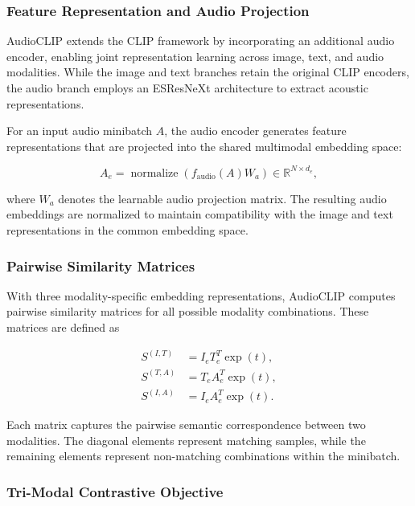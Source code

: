 \documentclass[pdflatex,sn-mathphys-num]{sn-jnl}%
\theoremstyle{thmstyleone}%
\theoremstyle{thmstyletwo}%
\theoremstyle{thmstylethree}%
\begin{document}
\subsubsection{Feature Representation and Audio Projection}

AudioCLIP extends the CLIP framework by incorporating an additional audio encoder, enabling joint representation learning across image, text, and audio modalities. While the image and text branches retain the original CLIP encoders, the audio branch employs an ESResNeXt architecture to extract acoustic representations.

For an input audio minibatch $A$, the audio encoder generates feature representations that are projected into the shared multimodal embedding space:

\begin{equation}
A_e =
\operatorname{normalize}
\left(f_{\mathrm{audio}}(A)W_a\right)
\in \mathbb{R}^{N \times d_e},
\label{eq:audioclip_audio}
\end{equation}

where $W_a$ denotes the learnable audio projection matrix. The resulting audio embeddings are normalized to maintain compatibility with the image and text representations in the common embedding space.

\subsubsection{Pairwise Similarity Matrices}

With three modality-specific embedding representations, AudioCLIP computes pairwise similarity matrices for all possible modality combinations. These matrices are defined as

\begin{align}
S^{(I,T)} &= I_e T_e^T \exp(t), \\
S^{(T,A)} &= T_e A_e^T \exp(t), \\
S^{(I,A)} &= I_e A_e^T \exp(t).
\label{eq:audioclip_similarity}
\end{align}

Each matrix captures the pairwise semantic correspondence between two modalities. The diagonal elements represent matching samples, while the remaining elements represent non-matching combinations within the minibatch.

\subsubsection{Tri-Modal Contrastive Objective}
\end{document}
